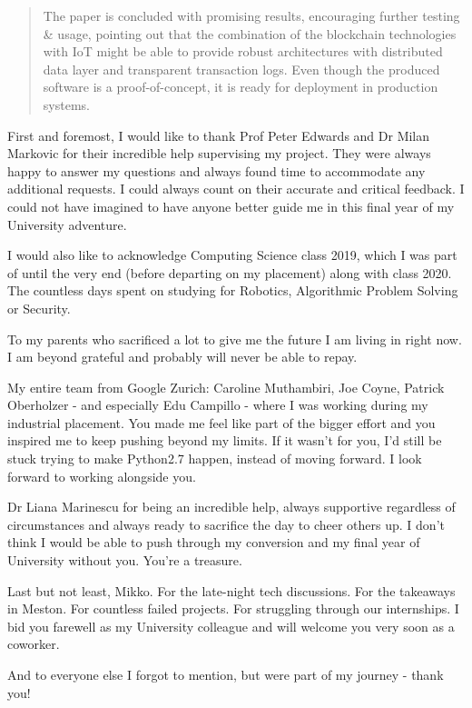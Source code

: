 \documentclass[msci]{abdnthesis}
\begin{document}
\begin{abstract}
  The paper is concluded with promising results, encouraging further testing \& usage, pointing out that the combination of the blockchain technologies with IoT might be able to provide robust architectures with distributed data layer and transparent transaction logs. Even though the produced software is a proof-of-concept, it is ready for deployment in production systems.
\end{abstract}

\begin{acknowledgements}
  First and foremost, I would like to thank Prof Peter Edwards and Dr Milan Markovic for their incredible help supervising my project. They were always happy to answer my questions and always found time to accommodate any additional requests. I could always count on their accurate and critical feedback. I could not have imagined to have anyone better guide me in this final year of my University adventure.

  I would also like to acknowledge Computing Science class 2019, which I was part of until the very end (before departing on my placement) along with class 2020. The countless days spent on studying for Robotics, Algorithmic Problem Solving or Security.

  To my parents who sacrificed a lot to give me the future I am living in right now. I am beyond grateful and probably will never be able to repay.

  My entire team from Google Zurich: Caroline Muthambiri, Joe Coyne, Patrick Oberholzer - and especially Edu Campillo - where I was working during my industrial placement. You made me feel like part of the bigger effort and you inspired me to keep pushing beyond my limits. If it wasn't for you, I'd still be stuck trying to make Python2.7 happen, instead of moving forward. I look forward to working alongside you.

  Dr Liana Marinescu for being an incredible help, always supportive regardless of circumstances and always ready to sacrifice the day to cheer others up. I don't think I would be able to push through my conversion and my final year of University without you. You're a treasure.

  Last but not least, Mikko. For the late-night tech discussions. For the takeaways in Meston. For countless failed projects. For struggling through our internships. I bid you farewell as my University colleague and will welcome you very soon as a coworker.

 And to everyone else I forgot to mention, but were part of my journey - thank you! 

  
\end{acknowledgements}
\end{document}
